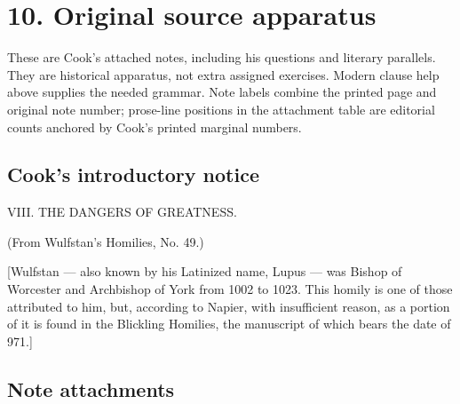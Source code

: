 \section*{10. Original source apparatus}

\begingroup\fontsize{10}{12.8}\selectfont
\setlength{\parskip}{1.5pt}
These are Cook’s attached notes, including his questions and literary parallels. They are historical apparatus, not extra assigned exercises. Modern clause help above supplies the needed grammar. Note labels combine the printed page and original note number; prose-line positions in the attachment table are editorial counts anchored by Cook’s printed marginal numbers.

\subsection*{Cook’s introductory notice}

VIII. THE DANGERS OF GREATNESS.

(From Wulfstan’s Homilies, No. 49.)

[Wulfstan — also known by his Latinized name, Lupus — was Bishop of Worcester and Archbishop of York from 1002 to 1023. This homily is one of those attributed to him, but, according to Napier, with insufficient reason, as a portion of it is found in the Blickling Homilies, the manuscript of which bears the date of 971.]

\subsection*{Note attachments}

